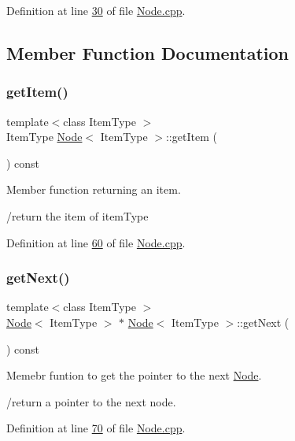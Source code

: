Definition at line \hyperlink{Node_8cpp_source_l00030}{30} of file \hyperlink{Node_8cpp_source}{Node.\+cpp}.



\subsection{Member Function Documentation}
\mbox{\label{classNode_a6c08caef312b6f2f69b5e090cf047514}} 
\subsubsection{\texorpdfstring{get\+Item()}{getItem()}}
{\footnotesize\ttfamily template$<$class Item\+Type $>$ \\
Item\+Type \hyperlink{classNode}{Node}$<$ Item\+Type $>$\+::get\+Item (\begin{DoxyParamCaption}{ }\end{DoxyParamCaption}) const}



Member function returning an item. 

/return the item of item\+Type 

Definition at line \hyperlink{Node_8cpp_source_l00060}{60} of file \hyperlink{Node_8cpp_source}{Node.\+cpp}.

\mbox{\label{classNode_a3eb0c96e03a3fd46ea1cff4c305bbedd}} 
\subsubsection{\texorpdfstring{get\+Next()}{getNext()}}
{\footnotesize\ttfamily template$<$class Item\+Type $>$ \\
\hyperlink{classNode}{Node}$<$ Item\+Type $>$ $\ast$ \hyperlink{classNode}{Node}$<$ Item\+Type $>$\+::get\+Next (\begin{DoxyParamCaption}{ }\end{DoxyParamCaption}) const}



Memebr funtion to get the pointer to the next \hyperlink{classNode}{Node}. 

/return a pointer to the next node. 

Definition at line \hyperlink{Node_8cpp_source_l00070}{70} of file \hyperlink{Node_8cpp_source}{Node.\+cpp}.

